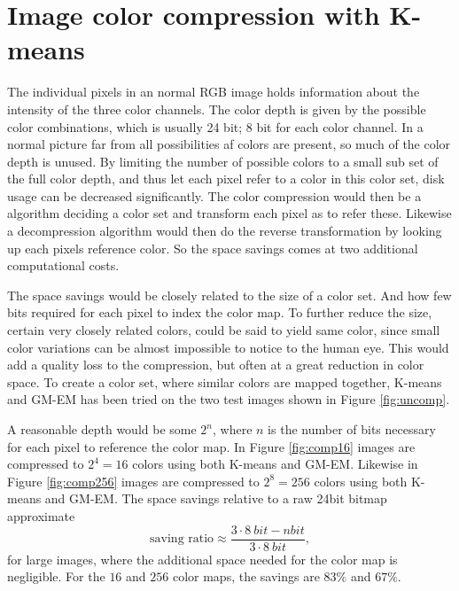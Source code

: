 \documentclass[a4paper,10pt,article,oneside,english]{memoir}
\begin{document}
\section*{Image color compression with K-means}
The individual pixels in an normal RGB image holds information about the intensity of the three color channels. The color depth is given by the possible color combinations, which is usually 24 bit; 8 bit for each color channel. In a normal picture far from all possibilities af colors are present, so much of the color depth is unused. By limiting the number of possible colors to a small sub set of the full color depth, and thus let each pixel refer to a color in this color set, disk usage can be decreased significantly. The color compression would then be a algorithm deciding a color set and transform each pixel as to refer these. Likewise a decompression algorithm would then do the reverse transformation by looking up each pixels reference color. So the space savings comes at two additional computational costs.

The space savings would be closely related to the size of a color set. And how few bits required for each pixel to index the color map. To further reduce the size, certain very closely related colors, could be said to yield same color, since small color variations can be almost impossible to notice to the human eye. This would add a quality loss to the compression, but often at a great reduction in color space. To create a color set, where similar colors are mapped together, K-means and GM-EM has been tried on the two test images shown in Figure \ref{fig:uncomp}. 

A reasonable depth would be some $2^n$, where $n$ is the number of bits necessary for each pixel to reference the color map. In Figure \ref{fig:comp16} images are compressed to $2^4=16$ colors using both K-means and GM-EM. Likewise in Figure \ref{fig:comp256} images are compressed to $2^8=256$ colors using both K-means and GM-EM. The space savings relative to a raw 24bit bitmap approximate 
$$\text{saving ratio} \approx \frac{3 \cdot \SI{8}{bit}- n \si{bit}}{3 \cdot\SI{8}{bit}},$$
for large images, where the additional space needed for the color map is negligible. For the $16$ and $256$ color maps, the savings are $83\%$ and $67\%$. 
\end{document}
